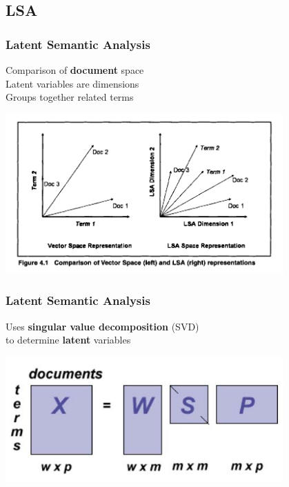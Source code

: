 \documentclass[t]{beamer}
\begin{document}
\subsection{LSA}
\begin{frame}
\frametitle{Latent Semantic Analysis}
Comparison of \textbf{document} space \\
Latent variables are dimensions \\
Groups together related terms

\includegraphics[width=0.8\textwidth]{img/vsm-vs-lsa.png}

\cite{deerwester1990,dumais2005}
\end{frame}

\begin{frame}
\frametitle{Latent Semantic Analysis}
Uses \textbf{singular value decomposition} (SVD) \\
to determine \textbf{latent} variables

\includegraphics[width=0.8\textwidth]{img/lsa.jpg}

\cite{deerwester1990,dumais2005}
\end{frame}
\end{document}
